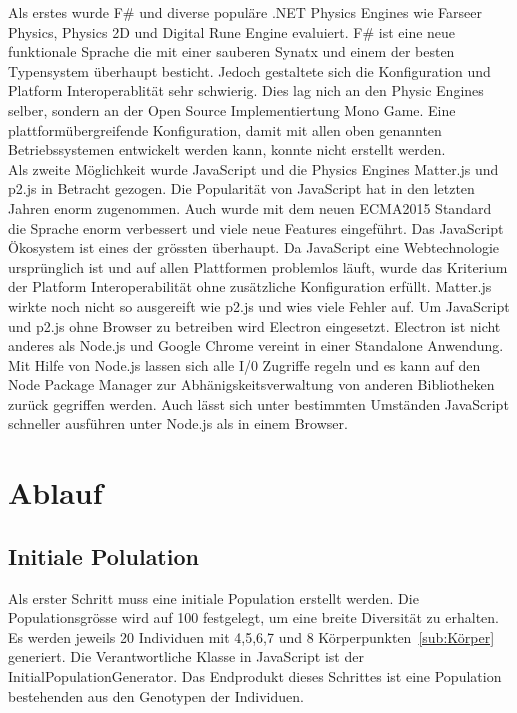     Als erstes wurde F\# und diverse populäre .NET Physics Engines wie Farseer Physics, Physics 2D und Digital Rune Engine evaluiert. %
    F\# ist eine neue funktionale Sprache die mit einer sauberen Synatx und einem der besten Typensystem überhaupt besticht.
    Jedoch gestaltete sich die Konfiguration und Platform Interoperablität sehr schwierig. Dies lag nich an den Physic Engines selber,
    sondern an der Open Source Implementiertung Mono Game. Eine plattformübergreifende Konfiguration,
    damit mit allen oben genannten Betriebssystemen entwickelt werden kann, konnte nicht erstellt werden.\\
    Als zweite Möglichkeit wurde JavaScript und die Physics Engines Matter.js und p2.js in Betracht gezogen.
    Die Popularität von JavaScript hat in den letzten Jahren enorm zugenommen.
    Auch wurde mit dem neuen ECMA2015 Standard die Sprache enorm verbessert und viele neue Features eingeführt. Das JavaScript Ökosystem ist eines der grössten überhaupt.
    Da JavaScript eine Webtechnologie ursprünglich ist und auf allen Plattformen problemlos läuft, wurde das Kriterium der Platform Interoperabilität ohne zusätzliche Konfiguration erfüllt.
    Matter.js wirkte noch nicht so ausgereift wie p2.js und wies viele Fehler auf. Um JavaScript und p2.js ohne Browser zu betreiben wird Electron eingesetzt.
    Electron ist nicht anderes als Node.js und Google Chrome vereint in einer Standalone Anwendung.
    Mit Hilfe von Node.js lassen sich alle I/0 Zugriffe regeln und es kann auf den Node Package Manager zur Abhänigskeitsverwaltung von anderen Bibliotheken zurück gegriffen werden.
    Auch lässt sich unter bestimmten Umständen JavaScript schneller ausführen unter Node.js als in einem Browser.
    
  \section{Ablauf\label{sec:Ablauf}}


    \subsection{Initiale Polulation\label{sec:Initiale Polulation}}

      Als erster Schritt muss eine initiale Population erstellt werden. Die Populationsgrösse wird auf 100 festgelegt,
      um eine breite Diversität zu erhalten.
      Es werden jeweils 20 Individuen mit 4,5,6,7 und 8 Körperpunkten~\ref{sub:Körper} generiert.
      Die Verantwortliche Klasse in JavaScript ist der InitialPopulationGenerator.
      Das Endprodukt dieses Schrittes ist eine Population bestehenden aus den Genotypen der Individuen.

